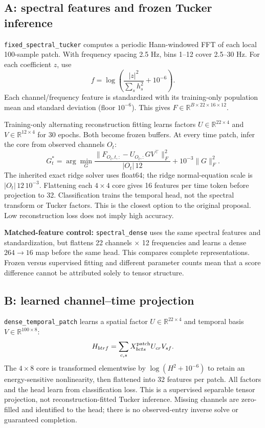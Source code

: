 \documentclass[11pt,a4paper]{article}
\newcommand{\code}[1]{{\small\nolinkurl{#1}}}
\begin{document}
\subsection{A: spectral features and frozen Tucker inference}
\code{fixed_spectral_tucker} computes a periodic Hann-windowed FFT of each local
100-sample patch. With frequency spacing 2.5 Hz, bins 1--12 cover 2.5--30 Hz.
For each coefficient $z$, use
\[
 f=\log\!\left(\frac{|z|^2}{\sum_s h_s^2}+10^{-6}\right).
\]
Each channel/frequency feature is standardized with its training-only population
mean and standard deviation (floor $10^{-6}$). This gives
$F\in\mathbb{R}^{B\times22\times16\times12}$.

Training-only alternating reconstruction fitting learns factors
$U\in\mathbb{R}^{22\times4}$ and $V\in\mathbb{R}^{12\times4}$ for 30 epochs.
Both become frozen buffers. At every time patch, infer the core from observed
channels $O_t$:
\[
 G_t^*=\arg\min_G
 \frac{\|F_{O_t,t,:}-U_{O_t,:}GV^\top\|_F^2}{|O_t|\,12}
 +10^{-3}\|G\|_F^2.
\]
The inherited exact ridge solver uses float64; the ridge normal-equation scale
is $|O_t|\,12\,10^{-3}$. Flattening each $4\times4$ core gives 16 features per
time token before projection to 32. Classification trains the temporal head,
not the spectral transform or Tucker factors. This is the closest option to
the original proposal. Low reconstruction loss does not imply high accuracy.

\textbf{Matched-feature control:} \code{spectral_dense} uses the same spectral
features and standardization, but flattens 22 channels $\times$ 12 frequencies
and learns a dense $264\to16$ map before the same head. This compares complete
representations. Frozen versus supervised fitting and different parameter counts
mean that a score difference cannot be attributed solely to tensor structure.

\subsection{B: learned channel--time projection}
\code{dense_temporal_patch} learns a spatial factor
$U\in\mathbb{R}^{22\times4}$ and temporal basis $V\in\mathbb{R}^{100\times8}$:
\[
 H_{btrf}=\sum_{c,s}X^{\rm patch}_{bcts}U_{cr}V_{sf}.
\]
The $4\times8$ core is transformed elementwise by
$\log(H^2+10^{-6})$ to retain an energy-sensitive nonlinearity, then flattened
into 32 features per patch. All factors and the head learn from classification
loss. This is a supervised separable tensor projection, not reconstruction-fitted
Tucker inference. Missing channels are zero-filled and identified to the head;
there is no observed-entry inverse solve or guaranteed completion.
\end{document}
